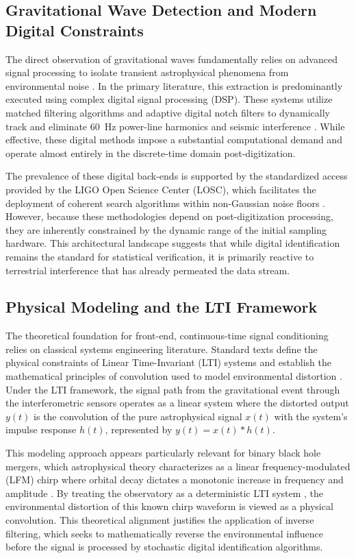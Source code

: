 \subsection{Gravitational Wave Detection and Modern Digital Constraints}
The direct observation of gravitational waves fundamentally relies on advanced signal processing to isolate transient astrophysical phenomena from environmental noise \cite{1}. In the primary literature, this extraction is predominantly executed using complex digital signal processing (DSP). These systems utilize matched filtering algorithms and adaptive digital notch filters to dynamically track and eliminate 60~Hz power-line harmonics and seismic interference \cite{1}. While effective, these digital methods impose a substantial computational demand and operate almost entirely in the discrete-time domain post-digitization.

The prevalence of these digital back-ends is supported by the standardized access provided by the LIGO Open Science Center (LOSC), which facilitates the deployment of coherent search algorithms within non-Gaussian noise floors \cite{6, 10}. However, because these methodologies depend on post-digitization processing, they are inherently constrained by the dynamic range of the initial sampling hardware. This architectural landscape suggests that while digital identification remains the standard for statistical verification, it is primarily reactive to terrestrial interference that has already permeated the data stream.

\subsection{Physical Modeling and the LTI Framework}
The theoretical foundation for front-end, continuous-time signal conditioning relies on classical systems engineering literature. Standard texts define the physical constraints of Linear Time-Invariant (LTI) systems and establish the mathematical principles of convolution used to model environmental distortion \cite{2}. Under the LTI framework, the signal path from the gravitational event through the interferometric sensors operates as a linear system where the distorted output $y(t)$ is the convolution of the pure astrophysical signal $x(t)$ with the system’s impulse response $h(t)$, represented by $y(t) = x(t) * h(t)$.

This modeling approach appears particularly relevant for binary black hole mergers, which astrophysical theory characterizes as a linear frequency-modulated (LFM) chirp where orbital decay dictates a monotonic increase in frequency and amplitude \cite{7}. By treating the observatory as a deterministic LTI system \cite{2}, the environmental distortion of this known chirp waveform \cite{7} is viewed as a physical convolution. This theoretical alignment justifies the application of inverse filtering, which seeks to mathematically reverse the environmental influence before the signal is processed by stochastic digital identification algorithms.

